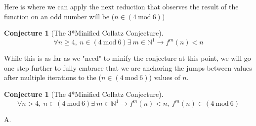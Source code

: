 \documentclass[12pt,a4paper]{amsart}
\numberwithin{equation}{section}
\theoremstyle{plain}
\theoremstyle{definition}
\newtheorem{Conj}[Th]{Conjecture}
\begin{document}
Here is where we can apply the next reduction that observes the result of the function on an odd number will be ($n \in \left ( 4\:\mathrm{mod}\:6 \right )$)

\begin{Conj}[The 3*Minified Collatz Conjecture]
\begin{equation}
\forall n\geq4\mathrm{,}\:n \in \left ( 4\:\mathrm{mod}\:6 \right ) \exists \: m \in \mathbb{N}^{1} \rightarrow f^{m}\left ( n \right )<n
\end{equation}
\end{Conj}

While this is as far as we "need" to minify the conjecture at this point, we will go one step further to fully embrace that we are anchoring the jumps between values after multiple iterations to the ($n \in \left ( 4\:\mathrm{mod}\:6 \right )$) values of $n$.

\begin{Conj}[The 4*Minified Collatz Conjecture]
\begin{equation}
\forall n>4\mathrm{,}\:n \in \left ( 4\:\mathrm{mod}\:6 \right ) \exists \: m \in \mathbb{N}^{1} \rightarrow f^{m}\left ( n \right )<n\mathrm{,}\:f^{m}\left ( n \right ) \in \left ( 4\:\mathrm{mod}\:6 \right )
\end{equation}
\end{Conj}

A.
\end{document}
